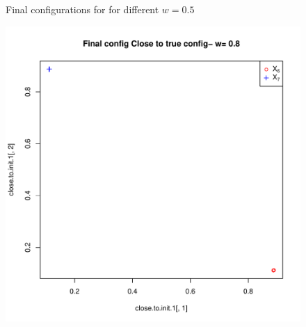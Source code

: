 \documentclass[12pt,oneside,final]{thesis}\usepackage[]{graphicx}\usepackage[]{color}
\begin{document}
\begin{figure}
\begin{minipage}[b]{0.5\linewidth}
\label{fig:Finalconfig-MultMin-w-0_5_b}

\end{minipage}

\caption{Final configurations for for different $w=0.5$ }
\label{fig:Finalconfig-MultMin-w-0_5}

\end{figure}

\begin{figure}
\begin{minipage}[b]{0.5\linewidth}
\centering
\includegraphics[scale=0.45]{true-min-w0_8.pdf}
\label{fig:Finalconfig-MultMin-w-0_8_a}



\end{minipage}
\end{figure}
\end{document}
